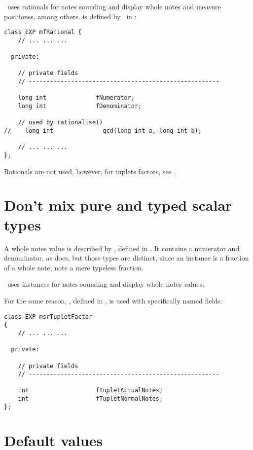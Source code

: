\mf\ uses rationals for notes sounding and display whole notes and measure positionss, among others.
 is defined by \libmusicxml\ in :
\begin{lstlisting}[language=CPlusPlus]
class EXP mfRational {
	// ... ... ...

  private:

    // private fields
    // ------------------------------------------------------

    long int              fNumerator;
    long int              fDenominator;

    // used by rationalise()
//    long int              gcd(long int a, long int b);

	// ... ... ...
};
\end{lstlisting}

Rationals are not used, however, for tuplets factors, see .


\section{Don't mix pure and typed scalar types}

A whole notes value is described by , defined in . It contains a numerator and denominator, as  does, but those types are distinct, since an  instance is a fraction of a whole note, note a mere typeless fraction.

\mf\ uses  instances for notes sounding and display whole notes values;

For the same reason, , defined in , is used with specifically named fields:
\begin{lstlisting}[language=CPlusPlus]
class EXP msrTupletFactor
{
	// ... ... ...

  private:

    // private fields
    // ------------------------------------------------------

    int                   fTupletActualNotes;
    int                   fTupletNormalNotes;
};
\end{lstlisting}


\section{Default values}

